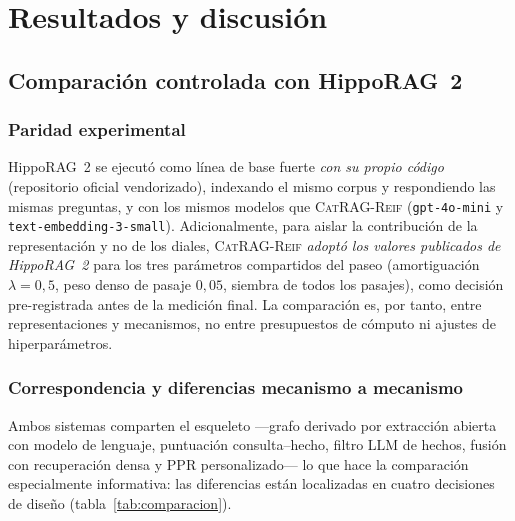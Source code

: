 \documentclass[11pt,a4paper]{article}
\newcommand{\sys}{\textsc{CatRAG-Reif}}          %
\newcommand{\hippo}{HippoRAG~2}
\begin{document}
\section{Resultados y discusión}
\label{sec:resultados}

\subsection{Comparación controlada con \hippo{}}
\label{sec:comparacion}

\subsubsection{Paridad experimental}

\hippo{} se ejecutó como línea de base fuerte \emph{con su propio código}
(repositorio oficial vendorizado), indexando el mismo corpus y respondiendo
las mismas preguntas, y con los mismos modelos que \sys{}
(\texttt{gpt-4o-mini} y \texttt{text-embedding-3-small}). Adicionalmente,
para aislar la contribución de la representación y no de los diales, \sys{}
\emph{adoptó los valores publicados de \hippo{}} para los tres parámetros
compartidos del paseo (amortiguación $\lambda=0{,}5$, peso denso de pasaje
$0{,}05$, siembra de todos los pasajes), como decisión pre-registrada antes
de la medición final. La comparación es, por tanto, entre representaciones y
mecanismos, no entre presupuestos de cómputo ni ajustes de hiperparámetros.

\subsubsection{Correspondencia y diferencias mecanismo a mecanismo}

Ambos sistemas comparten el esqueleto ---grafo derivado por extracción
abierta con modelo de lenguaje, puntuación consulta--hecho, filtro LLM de
hechos, fusión con recuperación densa y PPR personalizado--- lo que hace la
comparación especialmente informativa: las diferencias están localizadas en
cuatro decisiones de diseño (tabla~\ref{tab:comparacion}).
\end{document}
